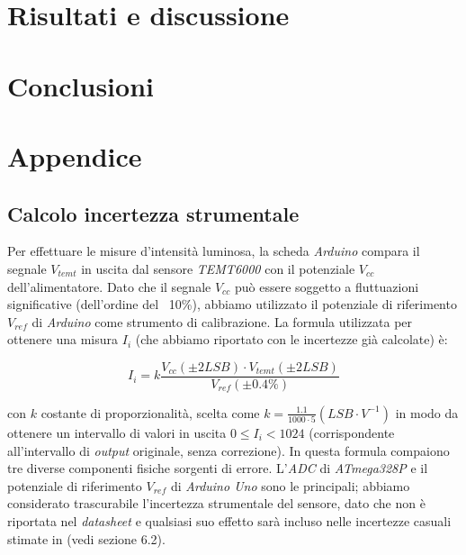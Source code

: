 \documentclass[12pt, a4paper, twoside]{article}
\begin{document}
\section{Risultati e discussione}\label{sec:risultati-e-discussione}
  \blindtext[2]

\section{Conclusioni}\label{sec:conclusioni}
  \blindtext[1]

\newpage
\section{Appendice}\label{sec:appendice}
  \subsection{Calcolo incertezza strumentale}\label{subsec:calcolo-incertezza-strumentale}
    Per effettuare le misure d'intensità luminosa, la scheda \emph{Arduino} compara
    il segnale $V_{temt}$ in uscita dal sensore \emph{TEMT6000} con il potenziale
    $V_{cc}$ dell'alimentatore.
    Dato che il segnale $V_{cc}$ può essere soggetto a fluttuazioni significative %
    (dell'ordine del ~10\%), abbiamo utilizzato il potenziale di riferimento
    $V_{ref}$ di \emph{Arduino} come strumento di calibrazione.
    La formula utilizzata per ottenere una misura $I_i$ (che abbiamo riportato con le
    incertezze già calcolate) è:

    \begin{equation}
      I_i = k \frac {
        V_{cc} (\pm 2LSB) \cdot V_{temt} (\pm 2LSB)
      } {
        V_{ref} (\pm 0.4\%)
      }\label{eq:misura-intensità}
    \end{equation}

    \noindent con $k$ costante di proporzionalità, scelta come %
    $k = \frac {1.1} {1000 \cdot 5} (LSB \cdot V^{-1})$ in modo da ottenere
    un intervallo di valori in uscita $0 \leq I_i < 1024$ (corrispondente
    all'intervallo di \emph{output} originale, senza correzione).
    In questa formula compaiono tre diverse componenti fisiche sorgenti di errore.
    L'\emph{ADC} di \emph{ATmega328P} e il potenziale di riferimento $V_{ref}$
    di \emph{Arduino Uno} sono le principali;
    abbiamo considerato trascurabile l’incertezza strumentale del sensore, dato
    che non è riportata nel \emph{datasheet} e %
    qualsiasi suo effetto sarà incluso
    nelle incertezze casuali stimate in (vedi sezione 6.2). %
\end{document}
